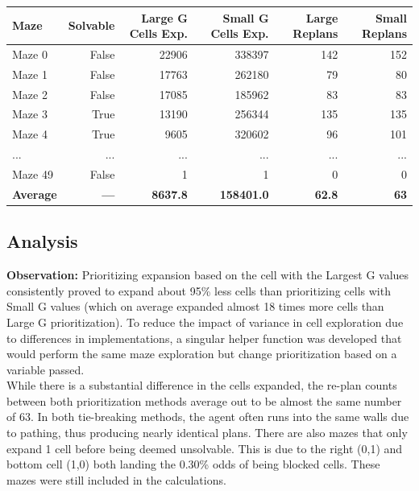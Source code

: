 \documentclass{article}
\begin{document}
\begin{center}
\begin{tabular}{|l|r|r|r|r|r|}
\hline
\textbf{Maze} & \textbf{Solvable} & \textbf{Large G Cells Exp.} & \textbf{Small G Cells Exp.} & \textbf{Large Replans} & \textbf{Small Replans} \\
\hline
Maze 0  & False & 22906  & 338397 & 142 & 152 \\
Maze 1  & False & 17763 & 262180 & 79  & 80  \\
Maze 2  & False & 17085 & 185962 & 83  & 83  \\
Maze 3  & True  & 13190 & 256344 & 135 & 135 \\
Maze 4  & True  & 9605   & 320602 & 96  & 101 \\
... & ... & ... & ... & ... & ... \\
Maze 49 & False & 1     & 1      & 0   & 0   \\
\hline
\textbf{Average} & \textbf{ --- } & \textbf{8637.8} & \textbf{158401.0} & \textbf{62.8} & \textbf{63} \\
\hline
\end{tabular}
\end{center}

\subsection*{Analysis}
\textbf{Observation:} Prioritizing expansion based on the cell with the Largest G values consistently proved to expand about 95\% less cells than prioritizing cells with Small G values (which on average expanded almost 18 times more cells than Large G prioritization). To reduce the impact of variance in cell exploration due to differences in implementations, a singular helper function was developed that would perform the same maze exploration but change prioritization based on a variable passed. \\

\noindent While there is a substantial difference in the cells expanded, the re-plan counts between both prioritization methods average out to be almost the same number of 63. In both tie-breaking methods, the agent often runs into the same walls due to pathing, thus producing nearly identical plans. There are also mazes that only expand 1 cell before being deemed unsolvable. This is due to the right (0,1) and bottom cell (1,0) both landing the 0.30\% odds of being blocked cells. These mazes were still included in the calculations.
\end{document}
